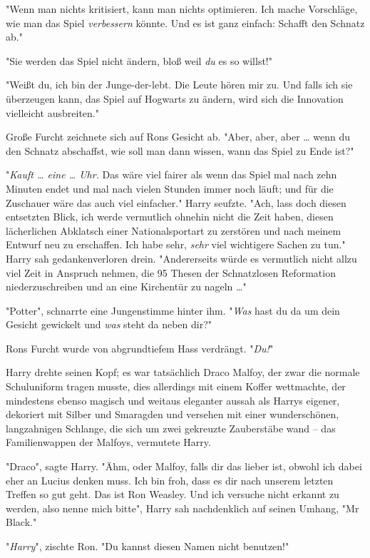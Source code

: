 {"Wenn man nichts kritisiert, kann man nichts optimieren. Ich mache Vorschläge, wie man das Spiel \emph{verbessern} könnte. Und es ist ganz einfach: Schafft den Schnatz ab."

"Sie werden das Spiel nicht ändern, bloß weil \emph{du} es so willst!"

"Weißt du, ich bin der Junge-der-lebt. Die Leute hören mir zu. Und falls ich sie überzeugen kann, das Spiel auf Hogwarts zu ändern, wird sich die Innovation vielleicht ausbreiten."

Große Furcht zeichnete sich auf Rons Gesicht ab. "Aber, aber, aber … wenn du den Schnatz abschaffst, wie soll man dann wissen, wann das Spiel zu Ende ist?"

"\emph{Kauft … eine … Uhr.} Das wäre viel fairer als wenn das Spiel mal nach zehn Minuten endet und mal nach vielen Stunden immer noch läuft; und für die Zuschauer wäre das auch viel einfacher." Harry seufzte. "Ach, lass doch diesen entsetzten Blick, ich werde vermutlich ohnehin nicht die Zeit haben, diesen lächerlichen Abklatsch einer Nationalsportart zu zerstören und nach meinem Entwurf neu zu erschaffen. Ich habe sehr, \emph{sehr} viel wichtigere Sachen zu tun." Harry sah gedankenverloren drein. "Andererseits würde es vermutlich nicht allzu viel Zeit in Anspruch nehmen, die 95 Thesen der Schnatzlosen Reformation niederzuschreiben und an eine Kirchentür zu nageln …"

"Potter", schnarrte eine Jungenstimme hinter ihm. "\emph{Was} hast du da um dein Gesicht gewickelt und \emph{was} steht da neben dir?"

Rons Furcht wurde von abgrundtiefem Hass verdrängt. "\emph{Du!}"

Harry drehte seinen Kopf; es war tatsächlich Draco Malfoy, der zwar die normale Schuluniform tragen musste, dies allerdings mit einem Koffer wettmachte, der mindestens ebenso magisch und weitaus eleganter aussah als Harrys eigener, dekoriert mit Silber und Smaragden und versehen mit einer wunderschönen, langzahnigen Schlange, die sich um zwei gekreuzte Zauberstäbe wand -- das Familienwappen der Malfoys, vermutete Harry.

"Draco", sagte Harry. "Ähm, oder Malfoy, falls dir das lieber ist, obwohl ich dabei eher an Lucius denken muss. Ich bin froh, dass es dir nach unserem letzten Treffen so gut geht. Das ist Ron Weasley. Und ich versuche nicht erkannt zu werden, also nenne mich bitte", Harry sah nachdenklich auf seinen Umhang, "Mr Black."

"\emph{Harry}", zischte Ron. "Du kannst diesen Namen nicht benutzen!"

}
